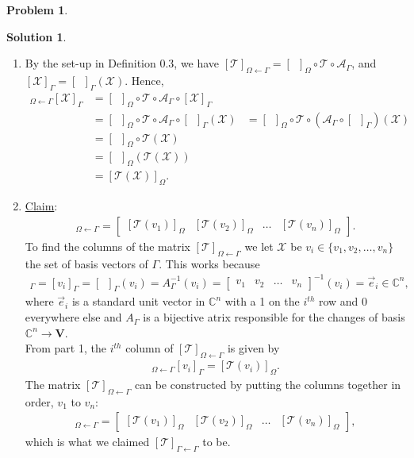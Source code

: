 \documentclass{article}
\theoremstyle{definition}
\newtheorem*{prob*}{Problem}
\newtheorem*{sln*}{Solution}
\newcommand{\V}{\mathbf{V}}
\newcommand{\T}{\mathcal{T}}
\begin{document}
\begin{prob*}
\begin{sln*}
\begin{enumerate}
			
			\item By the set-up in Definition 0.3, we have $[\T]_{\Omega\leftarrow \Gamma} = [\,\,\,]_\Omega\circ\T\circ \mathcal{A}_\Gamma$, and $[\mathcal{X}]_\Gamma = [\,\,\,]_\Gamma(\mathcal{X})$. Hence,
			\begin{align*}
			[\T]_{\Omega\leftarrow \Gamma}[\mathcal{X}]_\Gamma 
			&= [\,\,\,]_\Omega\circ\T\circ \mathcal{A}_\Gamma \circ [\mathcal{X}]_\Gamma \\
			&= [\,\,\,]_\Omega\circ\T\circ \mathcal{A}_\Gamma \circ [\,\,\,]_\Gamma(\mathcal{X})
			&= [\,\,\,]_\Omega\circ\T\circ \left(\mathcal{A}_\Gamma \circ [\,\,\,]_\Gamma\right)(\mathcal{X})\\
			&= [\,\,\,]_\Omega\circ\T(\mathcal{X})\\
			&= [\,\,\,]_\Omega\left(\T(\mathcal{X})\right)\\
			&= [\mathcal{T}(\mathcal{X})]_\Omega.
			\end{align*}
			
			
			
			
			\item \underline{Claim}:
			\begin{align*}
			[\T]_{\Omega\leftarrow\Gamma} = \begin{bmatrix}
			[\T(v_1)]_\Omega & [\T(v_2)]_\Omega & \dots & [\T(v_n)]_\Omega
			\end{bmatrix}.
			\end{align*}
			 To find the columns of the matrix $[\T]_{\Omega\leftarrow\Gamma}$ we let $\mathcal{X}$ be $v_i \in \{v_1,v_2,\dots,v_n\}$ the set of basis vectors of $\Gamma$. This works because 
			\begin{align*}
			[\mathcal{X}]_\Gamma = [v_i]_\Gamma = [\,\,\,]_\Gamma(v_i)=A^{-1}_\Gamma(v_i) = \begin{bmatrix}
			v_1&v_2&\dots&v_n
			\end{bmatrix}^{-1}(v_i) =  \vec{e}_i \in \mathbb{C}^n,
			\end{align*}
			where $\vec{e}_i$ is a standard unit vector in $\mathbb{C}^n$ with a 1 on the $i^{th}$ row and 0 everywhere else and $A_\Gamma$ is a bijective atrix responsible for the changes of basis $\mathbb{C}^n\to \V$.\\
			 
			From part 1, the $i^{th}$ column of $[\T]_{\Omega\leftarrow \Gamma}$ is given by 
			\begin{align*}
			[\T]_{\Omega\leftarrow \Gamma}[v_i]_\Gamma = [\T(v_i)]_\Omega.
			\end{align*}
			The matrix $[\T]_{\Omega\leftarrow\Gamma}$ can be constructed by putting the columns together in order, $v_1$ to $v_n$:
			\begin{align*}
			[\T]_{\Omega\leftarrow\Gamma} = \begin{bmatrix}
			[\T(v_1)]_\Omega & [\T(v_2)]_\Omega & \dots & [\T(v_n)]_\Omega
			\end{bmatrix},
			\end{align*}
 			which is what we claimed $[\T]_{\Gamma\leftarrow \Gamma}$ to be.\\
 			

\end{enumerate}
\end{sln*}
\end{prob*}
\end{document}
